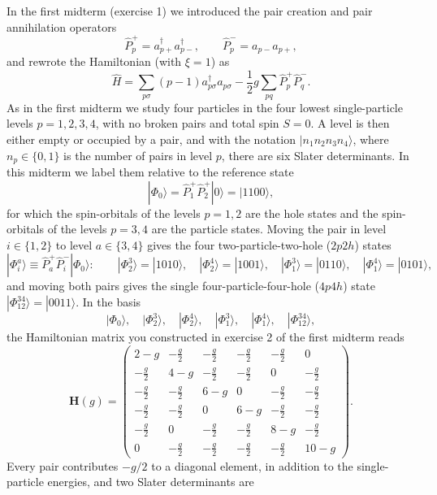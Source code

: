 \documentclass[prc]{revtex4}
\begin{document}
In the first midterm (exercise 1) we introduced the pair creation and
pair annihilation operators
\[
\hat{P}^{+}_p = a^\dag_{p+}a^\dag_{p-},\qquad
\hat{P}^{-}_p = a_{p-}a_{p+},
\]
and rewrote the Hamiltonian (with $\xi=1$) as
\[
\hat{H}=\sum_{p\sigma}(p-1)a_{p\sigma}^{\dagger}a_{p\sigma}
-\frac{1}{2}g\sum_{pq}\hat{P}^{+}_p\hat{P}^{-}_q.
\]
As in the first midterm we study four particles in the four lowest
single-particle levels $p=1,2,3,4$, with no broken pairs and total
spin $S=0$. A level is then either empty or occupied by a pair, and
with the notation $|n_1n_2n_3n_4\rangle$, where $n_p\in\{0,1\}$ is the
number of pairs in level $p$, there are six Slater determinants. In
this midterm we label them relative to the reference state
\[
|\Phi_0\rangle=\hat{P}^+_1\hat{P}^+_2|0\rangle=|1100\rangle ,
\]
for which the spin-orbitals of the levels $p=1,2$ are the hole states
and the spin-orbitals of the levels $p=3,4$ are the particle
states. Moving the pair in level $i\in\{1,2\}$ to level $a\in\{3,4\}$
gives the four two-particle-two-hole ($2p2h$) states
\[
|\Phi_i^a\rangle\equiv\hat{P}^+_a\hat{P}^-_i|\Phi_0\rangle:\qquad
|\Phi_2^3\rangle=|1010\rangle,\quad
|\Phi_2^4\rangle=|1001\rangle,\quad
|\Phi_1^3\rangle=|0110\rangle,\quad
|\Phi_1^4\rangle=|0101\rangle,
\]
and moving both pairs gives the single four-particle-four-hole
($4p4h$) state $|\Phi_{12}^{34}\rangle=|0011\rangle$. In the basis
\[
|\Phi_0\rangle,\quad |\Phi_2^3\rangle,\quad |\Phi_2^4\rangle,\quad
|\Phi_1^3\rangle,\quad |\Phi_1^4\rangle,\quad |\Phi_{12}^{34}\rangle ,
\]
the Hamiltonian matrix you constructed in exercise 2 of the first
midterm reads
\begin{equation}
\bm{H}(g)=
\begin{pmatrix}
2-g & -\frac{g}{2} & -\frac{g}{2} & -\frac{g}{2} & -\frac{g}{2} & 0\\[4pt]
-\frac{g}{2} & 4-g & -\frac{g}{2} & -\frac{g}{2} & 0 & -\frac{g}{2}\\[4pt]
-\frac{g}{2} & -\frac{g}{2} & 6-g & 0 & -\frac{g}{2} & -\frac{g}{2}\\[4pt]
-\frac{g}{2} & -\frac{g}{2} & 0 & 6-g & -\frac{g}{2} & -\frac{g}{2}\\[4pt]
-\frac{g}{2} & 0 & -\frac{g}{2} & -\frac{g}{2} & 8-g & -\frac{g}{2}\\[4pt]
0 & -\frac{g}{2} & -\frac{g}{2} & -\frac{g}{2} & -\frac{g}{2} & 10-g
\end{pmatrix}.
\label{eq:hmatrix}
\end{equation}
Every pair contributes $-g/2$ to a diagonal element, in addition to
the single-particle energies, and two Slater determinants are
\end{document}
